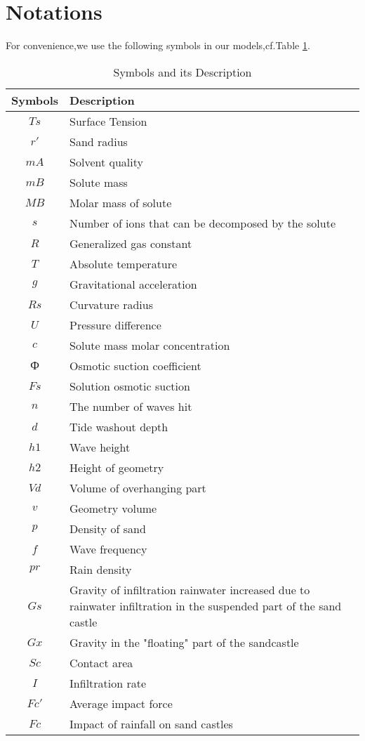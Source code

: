 \documentclass[12pt]{article}
\begin{document}
\section{Notations}
For convenience,we use the following symbols in our models,cf.Table \ref{tab1}.
\begin{table}[H]
	\begin{tabular}{cl}
		\hline
		Symbols&Description\\
		\hline
		$Ts$&Surface Tension\\
		$r'$&Sand radius\\
		$mA$&Solvent quality\\
		$mB$&Solute mass\\
		$MB$&Molar mass of solute\\
		$s$&Number of ions that can be decomposed by the solute \\
		$R$&Generalized gas constant\\
		$T$&Absolute temperature\\
		$g$&Gravitational acceleration\\
		$Rs$&Curvature radius\\
		$U$&Pressure difference\\
		$c$&Solute mass molar concentration\\
		$Ф$&Osmotic suction coefficient\\
		$Fs$&Solution osmotic suction\\
		$n$&The number of waves hit \\
		$d$&Tide washout depth\\
		$h1$&Wave height\\
		$h2$&Height of geometry \\
		$Vd$&Volume of overhanging part\\
		$v$&Geometry volume\\
		$p$&Density of sand\\
		$f$&Wave frequency\\
		$pr$&Rain density\\
		$Gs$& Gravity of infiltration rainwater increased due to rainwater infiltration in the suspended part of the sand castle  \\
		$Gx$& Gravity in the "floating" part of the sandcastle\\
		$Sc$&Contact area\\
		$I$&Infiltration rate\\
		$Fc'$&Average impact force \\
		$Fc$&Impact of rainfall on sand castles\\
		\hline
	\end{tabular}
	\caption{Symbols and its Description}
	\label{tab1}
\end{table}
\end{document}
